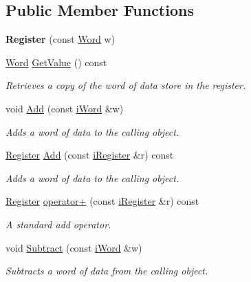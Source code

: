 \subsection*{Public Member Functions}
\begin{DoxyCompactItemize}
\item 
\hypertarget{classRegister_a6aea43b4c4ad669073f20fbcd274b49c}{
{\bfseries Register} (const \hyperlink{classWord}{Word} w)}
\label{classRegister_a6aea43b4c4ad669073f20fbcd274b49c}

\item 
\hyperlink{classWord}{Word} \hyperlink{classRegister_a379734c28ab8258ce528a96de24cfa1a}{GetValue} () const 
\begin{DoxyCompactList}\small\item\em Retrieves a copy of the word of data store in the register. \item\end{DoxyCompactList}\item 
void \hyperlink{classRegister_a73d8564754d7ddb7e8349001010e688b}{Add} (const \hyperlink{classiWord}{iWord} \&w)
\begin{DoxyCompactList}\small\item\em Adds a word of data to the calling object. \item\end{DoxyCompactList}\item 
\hyperlink{classRegister}{Register} \hyperlink{classRegister_a9d9c6801db55e8706eb242b1e0e0fa3f}{Add} (const \hyperlink{classiRegister}{iRegister} \&r) const 
\begin{DoxyCompactList}\small\item\em Adds a word of data to the calling object. \item\end{DoxyCompactList}\item 
\hyperlink{classRegister}{Register} \hyperlink{classRegister_a55de0c3b5f8fe14df7c24bce777204e0}{operator+} (const \hyperlink{classiRegister}{iRegister} \&r) const 
\begin{DoxyCompactList}\small\item\em A standard add operator. \item\end{DoxyCompactList}\item 
void \hyperlink{classRegister_a726a720b6bcca282945f1c0a65ca0dd4}{Subtract} (const \hyperlink{classiWord}{iWord} \&w)
\begin{DoxyCompactList}\small\item\em Subtracts a word of data from the calling object. \item\end{DoxyCompactList}\item 

\end{DoxyCompactItemize}
